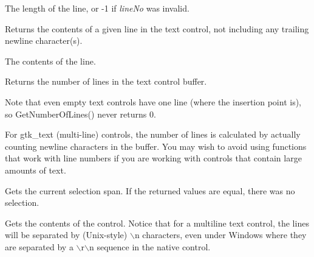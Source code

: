 The length of the line, or -1 if {\it lineNo} was invalid.

\label{wxtextctrlgetlinetext}


Returns the contents of a given line in the text control, not including
any trailing newline character(s).




The contents of the line.

\label{wxtextctrlgetnumberoflines}


Returns the number of lines in the text control buffer.


Note that even empty text controls have one line (where the insertion point
is), so GetNumberOfLines() never returns 0.

For gtk\_text (multi-line) controls, the number of lines is
calculated by actually counting newline characters in the buffer. You
may wish to avoid using functions that work with line numbers if you are
working with controls that contain large amounts of text.

\label{wxtextctrlgetselection}


Gets the current selection span. If the returned values are equal, there was
no selection.





\label{wxtextctrlgetvalue}


Gets the contents of the control. Notice that for a multiline text control,
the lines will be separated by (Unix-style) $\backslash$n characters, even under
Windows where they are separated by a $\backslash$r$\backslash$n sequence in the native control.

